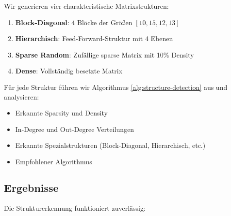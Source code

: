 ﻿\documentclass[a4paper,12pt]{report}
\theoremstyle{definition}
\begin{document}
	Wir generieren vier charakteristische Matrixstrukturen:
	
	\begin{enumerate}
		\item \textbf{Block-Diagonal}: $4$ Blöcke der Größen $[10, 15, 12, 13]$
		\item \textbf{Hierarchisch}: Feed-Forward-Struktur mit 4 Ebenen
		\item \textbf{Sparse Random}: Zufällige sparse Matrix mit 10\% Density
		\item \textbf{Dense}: Vollständig besetzte Matrix
	\end{enumerate}
	
	Für jede Struktur führen wir Algorithmus \ref{alg:structure-detection} aus und analysieren:
	\begin{itemize}
		\item Erkannte Sparsity und Density
		\item In-Degree und Out-Degree Verteilungen
		\item Erkannte Spezialstrukturen (Block-Diagonal, Hierarchisch, etc.)
		\item Empfohlener Algorithmus
	\end{itemize}
	
	\subsection{Ergebnisse}
	
	Die Strukturerkennung funktioniert zuverlässig:
	
\end{document}
